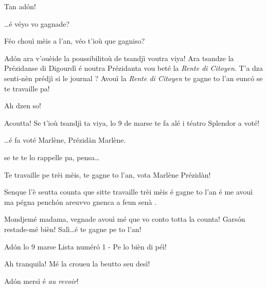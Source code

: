 \begin{drama}
\Joellespeaks Tan ad\'on!

\Dallasspeaks \ldots é véyo vo gagnade?

\Jeanspeaks Féo chouì mèis a l'an, véo t'ioù que gagniso?

\Dallasspeaks Ad\'on ara v'ouèide la poussibilitoù de tsandjì voutra viya! Ara tsandze la Prézidanse di Digourdì é noutra Prézidanta vou beté la \textit{Rente di Citoyen}. T'a dza senti-nèn prédjì si le journal \journal ? Avouì la \textit{Rente di Citoyen} te gagne to l'an eunc\'o se te travaille pa!

\Jeanspeaks Ah dzen so!

\Dallasspeaks Acoutta! Se t'ioù tsandjì ta viya, lo 9 de marse te fa alé i téatro Splendor a voté!
 
\Joellespeaks \ldots é fa voté Marlène, Prézidàn Marlène.

\Dallasspeaks {} se te te lo rappelle pa, pensa\ldots
 
\Joelledallasspeaks {} \og Te travaille pe trèi mèis, te gagne to l'an, vota Marlène Prézidàn\fg!



\Saventaspeaks Senque l'è seutta counta que sitte travaille trèi mèis é gagne to l’an é me avouì ma pégna pench\'on areuvvo gnenca a feun senà .

\Dallasspeaks Mondjemé madama, vegnade avouì mé que vo conto totta la counta!  Gars\'on restade-mé bièn! Salì\ldots é te gagne pe to l'an!



\Joellespeaks Ad\'on lo 9 marse Lista num\'er\'o 1 - Pe lo bièn di péì!

\Jeanspeaks Ah tranquila! Mé la croueu la beutto seu desì! 

\Joellespeaks Ad\'on mersì é \textit{au revoir}!




\end{drama}
